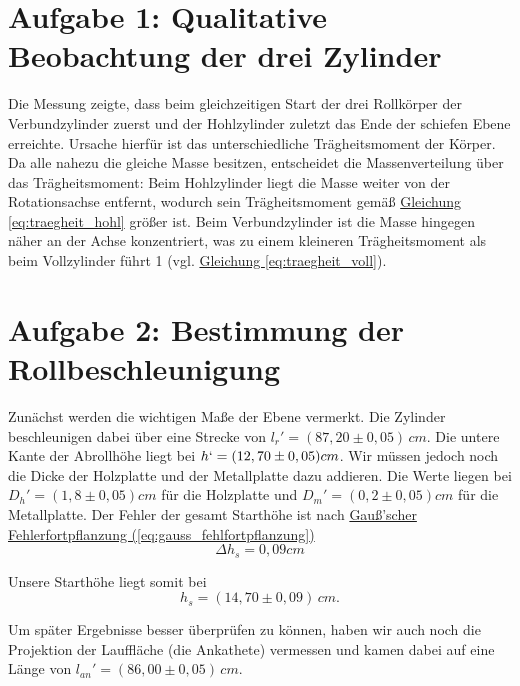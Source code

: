 \twocolumn


\section{Aufgabe 1: Qualitative Beobachtung der drei Zylinder}
Die Messung zeigte, dass beim gleichzeitigen Start der drei Rollkörper der Verbundzylinder 
zuerst und der Hohlzylinder zuletzt das Ende der schiefen Ebene erreichte. 
Ursache hierfür ist das unterschiedliche Trägheitsmoment der Körper. 
Da alle nahezu die gleiche Masse besitzen, entscheidet die Massenverteilung über das Trägheitsmoment: 
Beim Hohlzylinder liegt die Masse weiter von der Rotationsachse entfernt, wodurch sein 
Trägheitsmoment gemäß \hyperref[eq:traegheit_hohl]{Gleichung \ref*{eq:traegheit_hohl}} größer ist. 
Beim Verbundzylinder ist die Masse hingegen näher an der Achse konzentriert, was zu einem kleineren Trägheitsmoment als beim Vollzylinder führt 1
(vgl. \hyperref[eq:traegheit_voll]{Gleichung \ref*{eq:traegheit_voll}}).


\section{Aufgabe 2: Bestimmung der Rollbeschleunigung}
Zunächst werden die wichtigen Maße der Ebene vermerkt. Die Zylinder beschleunigen dabei über eine Strecke von $l_{r}' = (87,20 \pm 0,05) \, cm$. Die untere Kante der Abrollhöhe liegt bei $h` = (12,70 \pm 0,05) cm$. Wir müssen jedoch noch die Dicke der Holzplatte und der Metallplatte dazu addieren. Die Werte liegen bei $D_h'= (1,8 \pm 0,05) cm$ für die Holzplatte und $D_m'= (0,2 \pm 0,05) cm$ für die Metallplatte.
Der Fehler der gesamt Starthöhe ist nach \hyperref[eq:gauss_fehlfortpflanzung]{Gauß'scher Fehlerfortpflanzung (\ref*{eq:gauss_fehlfortpflanzung})}
\begin{equation}
    \Delta h_s = 0,09 cm
\end{equation}

Unsere Starthöhe liegt somit bei
\begin{equation}
    h_s = (14,70 \pm 0,09)\, cm.
\end{equation}

Um später Ergebnisse besser überprüfen zu können, haben wir auch noch die Projektion der Lauffläche (die Ankathete) vermessen und kamen dabei auf eine Länge von $l_{an}' = (86,00 \pm 0,05) \, cm$.

